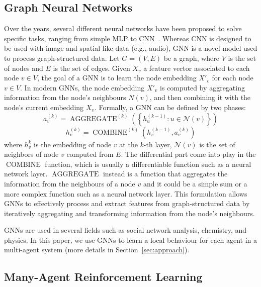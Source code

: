 \documentclass[conference]{IEEEtran}
\begin{document}
\subsection{Graph Neural Networks}
Over the years, several different neural networks have been proposed to solve specific tasks, ranging from 
  simple \ac{MLP} to \ac{CNN}~\cite{oshea2015introduction}.
%
Whereas \ac{CNN} is designed to be used with image and spatial-like data (e.g., audio),
 \ac{GNN} is a novel model used to process graph-structured data. 
%
Let $ G = (V, E) $ be a graph, where $ V $ is the set of nodes and $ E $ is the set of edges. 
%
Given $X_v$ a feature vector associated to each node $v \in V$, 
 the goal of a GNN is to learn the node embedding $X'_v$ for each node $v \in V$.
 In modern GNNs, the node embedding $X'_v$ is computed by aggregating information from the node's neighbours $N(v)$,
  and then combining it with the node's current embedding $X_v$.
% 
Formally, a GNN can be defined by two phases:
\begin{equation}
a_{v}^{(k)}=\operatorname{AGGREGATE}^{(k)}\left(\left\{h_{u}^{(k-1)}: u \in \mathcal{N}(v)\right\}\right)   
\end{equation}
\begin{equation}
h_{v}^{(k)}=\operatorname{COMBINE}^{(k)}\left(h_{v}^{(k-1)}, a_{v}^{(k)}\right)
\end{equation}
where $h_{v}^{k}$ is the embedding of node $v$ at the $k$-th layer, 
 $\mathcal{N}(v)$ is the set of neighbors of node $v$ computed from $E$.
%
The differential part come into play in the $\operatorname{COMBINE}$ function, 
 which is usually a differentiable function such as a neural network layer.
%
$\operatorname{AGGREGATE} $ instead is a function that aggregates the information from the neighbours of a node $v$
  and it could be a simple sum or a more complex function such as a neural network layer.
%
This formulation allows GNNs to effectively process and extract features from graph-structured data by iteratively aggregating and transforming information from the node's neighbours.

\acp{GNN} are used in several fields such as social network analysis, chemistry, and physics.
In this paper, we use GNNs to learn a local behaviour for each agent in a multi-agent system (more details in Section~\ref{sec:approach}).
\subsection{Many-Agent Reinforcement Learning}
\end{document}
